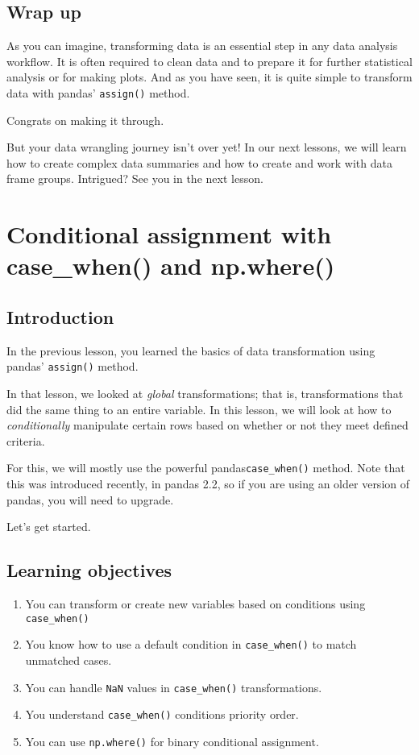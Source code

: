 \documentclass[
  letterpaper,
  DIV=11,
  numbers=noendperiod]{scrreprt}
\begin{document}
\section{Wrap up}\label{wrap-up-6}

As you can imagine, transforming data is an essential step in any data
analysis workflow. It is often required to clean data and to prepare it
for further statistical analysis or for making plots. And as you have
seen, it is quite simple to transform data with pandas'
\texttt{assign()} method.

Congrats on making it through.

But your data wrangling journey isn't over yet! In our next lessons, we
will learn how to create complex data summaries and how to create and
work with data frame groups. Intrigued? See you in the next lesson.

\chapter{Conditional assignment with case\_when() and
np.where()}\label{conditional-assignment-with-case_when-and-np.where}

\section{Introduction}\label{introduction-7}

In the previous lesson, you learned the basics of data transformation
using pandas' \texttt{assign()} method.

In that lesson, we looked at \emph{global} transformations; that is,
transformations that did the same thing to an entire variable. In this
lesson, we will look at how to \emph{conditionally} manipulate certain
rows based on whether or not they meet defined criteria.

For this, we will mostly use the powerful pandas\texttt{case\_when()}
method. Note that this was introduced recently, in pandas 2.2, so if you
are using an older version of pandas, you will need to upgrade.

Let's get started.

\section{Learning objectives}\label{learning-objectives-9}

\begin{enumerate}
\def\labelenumi{\arabic{enumi}.}
\item
  You can transform or create new variables based on conditions using
  \texttt{case\_when()}
\item
  You know how to use a default condition in \texttt{case\_when()} to
  match unmatched cases.
\item
  You can handle \texttt{NaN} values in \texttt{case\_when()}
  transformations.
\item
  You understand \texttt{case\_when()} conditions priority order.
\item
  You can use \texttt{np.where()} for binary conditional assignment.
\end{enumerate}
\end{document}
